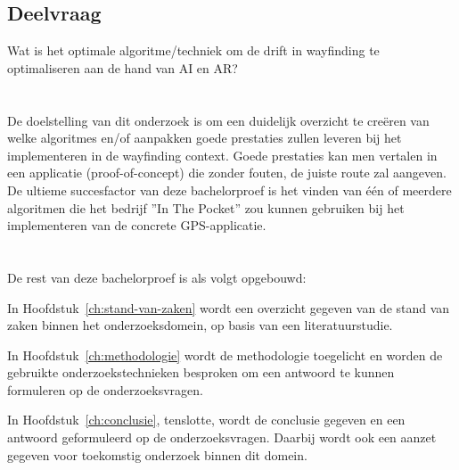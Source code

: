 \subsection{Deelvraag}
Wat is het optimale algoritme/techniek om de drift in wayfinding te optimaliseren aan de hand van AI en AR? 

\section{}
\label{sec:onderzoeksdoelstelling}

De doelstelling van dit onderzoek is om een duidelijk overzicht te creëren van welke algoritmes en/of aanpakken goede prestaties zullen leveren bij het implementeren in de wayfinding context. Goede prestaties kan men vertalen in een applicatie (proof-of-concept) die zonder fouten, de juiste route zal aangeven.
De ultieme succesfactor van deze bachelorproef is het vinden van één of meerdere algoritmen die het bedrijf ''In The Pocket'' zou kunnen gebruiken bij het implementeren van de concrete GPS-applicatie.



\section{}
\label{sec:opzet-bachelorproef}


De rest van deze bachelorproef is als volgt opgebouwd:

In Hoofdstuk~\ref{ch:stand-van-zaken} wordt een overzicht gegeven van de stand van zaken binnen het onderzoeksdomein, op basis van een literatuurstudie.

In Hoofdstuk~\ref{ch:methodologie} wordt de methodologie toegelicht en worden de gebruikte onderzoekstechnieken besproken om een antwoord te kunnen formuleren op de onderzoeksvragen.


In Hoofdstuk~\ref{ch:conclusie}, tenslotte, wordt de conclusie gegeven en een antwoord geformuleerd op de onderzoeksvragen. Daarbij wordt ook een aanzet gegeven voor toekomstig onderzoek binnen dit domein.